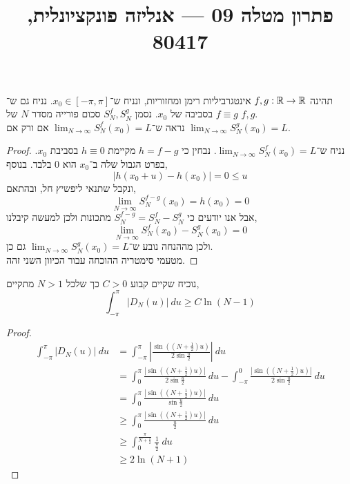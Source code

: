 
\title{פתרון מטלה 09 --- אנליזה פונקציונלית, 80417}

\DeclareMathOperator\sgn{sgn}


\maketitle
\maketitleprint[teal]

\question{}
תהינה $f, g : \mathbb{R} \to \mathbb{R}$ אינטגרביליות רימן ומחזוריות, ונניח ש־$x_0 \in [-\pi, \pi]$.
נניח גם ש־$f \equiv g$ בסביבה של $x_0$.
נסמן $S_N^f, S_N^g$ סכום פורייה מסדר $N$ של $f, g$. \\
נראה ש־$\lim_{N \to \infty} S_N^f(x_0) = L$ אם ורק אם $\lim_{N \to \infty} S_N^g(x_0) = L$.
\begin{proof}
	נניח ש־$\lim_{N \to \infty} S_N^f(x_0) = L$.
	נבחין כי $h = f - g$ מקיימת $h \equiv 0$ בסביבת $x_0$.
	בפרט הגבול שלה ב־$x_0$ הוא $0$ בלבד.
	בנוסף,
	\[
		|h(x_0 + u) - h(x_0)|
		= 0 \le u
	\]
	ונקבל שתנאי ליפשיץ חל, ובהתאם,
	\[
		\lim_{N \to \infty} S_N^{f - g}(x_0)
		= h(x_0)
		= 0
	\]
	אבל אנו יודעים כי $S_N^{f - g} = S_N^f - S_N^g$ מתכונות ולכן למעשה קיבלנו,
	\[
		\lim_{N \to \infty} S_N^f(x_0) - S_N^g(x_0)
		= 0
	\]
	ולכן מההנחה נובע ש־$\lim_{N \to \infty} S_N^g(x_0) = L$ גם כן. \\
	מטעמי סימטריה ההוכחה עבור הכיוון השני זהה.
\end{proof}

\question{}
נוכיח שקיים קבוע $C > 0$ כך שלכל $N > 1$ מתקיים,
\[
	\int_{-\pi}^{\pi} | D_N(u) |\ du
	\ge C \ln(N - 1)
\]
\begin{proof}
	\begin{align*}
		\int_{-\pi}^{\pi} | D_N(u) |\ du
		& = \int_{-\pi}^{\pi} \left\lvert \frac{\sin((N + \frac{1}{2}) u)}{2 \sin \frac{u}{2}} \right\rvert\ du \\
		& = \int_{0}^{\pi} \frac{|\sin((N + \frac{1}{2}) u)|}{2 \sin \frac{u}{2}}\ du - \int_{-\pi}^{0} \frac{|\sin((N + \frac{1}{2}) u)|}{2 \sin \frac{u}{2}}\ du \\
		& = \int_{0}^{\pi} \frac{|\sin((N + \frac{1}{2}) u)|}{\sin \frac{u}{2}}\ du \\
		& \ge \int_{0}^{\pi} \frac{|\sin((N + \frac{1}{2}) u)|}{\frac{u}{2}}\ du \\
		& \ge \int_{0}^{\frac{\pi}{N + \frac{1}{2}}} \frac{1}{\frac{u}{2}}\ du \\
		& \ge 2 \ln(N + 1)
	\end{align*}
\end{proof}

